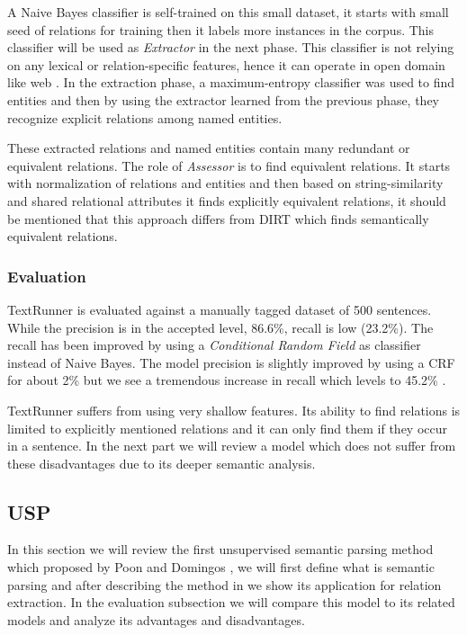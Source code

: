    
    
    A Naive Bayes classifier is self-trained on this small dataset, it 
   starts with small seed of relations for training then it labels more instances in the corpus. This classifier will be used as
    \emph{Extractor}
   in the next phase. This classifier is not relying on any lexical or relation-specific features, hence it can operate 
   in open domain like web \cite{Banko2009}. In the extraction phase, a
   maximum-entropy classifier was used to find entities and then by using the extractor learned from the previous phase, they recognize explicit relations among named entities.
   
   These extracted relations and named entities contain many redundant or equivalent relations. The role of \emph{Assessor}
    is to find equivalent relations. It starts with normalization of relations and entities and then based on string-similarity
     and shared relational attributes it finds explicitly equivalent relations, it should be mentioned that 
     this approach differs from DIRT which finds semantically equivalent relations.
     
      
     
\subsubsection{Evaluation}
\label{ssec:textrunner-eval}
     
     TextRunner is evaluated against a manually tagged dataset of 500 sentences. While the precision is in 
      the accepted level, 86.6\%, recall is low (23.2\%). The recall has been improved by using a \emph{Conditional Random Field}
       \cite{Banko2009} as classifier instead of Naive Bayes. The model precision is slightly improved by using a CRF for about 2\%
        but we see a tremendous increase in recall which levels to 45.2\% . 
 
TextRunner suffers from using very shallow features. Its ability to find relations is limited to explicitly mentioned
 relations and it can only find them if they occur in a sentence. In the next part we will review a model 
 which does not suffer from these disadvantages due to its deeper semantic analysis. 
 

\subsection{USP}
\label{ssec:usp}

In this section we will review the first unsupervised semantic parsing method which proposed by Poon and Domingos \cite{Poon2009},
we will first define what is semantic parsing and after describing the method in \cite{Poon2009} we show its application for relation extraction.
In the evaluation subsection we will compare this model to its related models and analyze its advantages and disadvantages.

